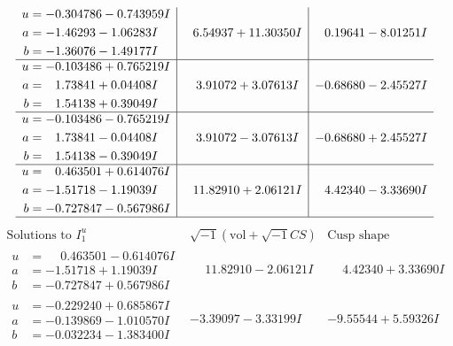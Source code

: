\documentclass[1p]{elsarticle_modified}
\theoremstyle{definition}
\newcommand{\I}{\sqrt{-1}}
\begin{document}
$$\begin{array}{c|c|c}
\begin{aligned}
u &= -0.304786 - 0.743959 I \\
a &= -1.46293 - 1.06283 I \\
b &= -1.36076 - 1.49177 I\end{aligned}
 & \phantom{-}6.54937 + 11.30350 I & \phantom{-}0.19641 - 8.01251 I \\ \hline\begin{aligned}
u &= -0.103486 + 0.765219 I \\
a &= \phantom{-}1.73841 + 0.04408 I \\
b &= \phantom{-}1.54138 + 0.39049 I\end{aligned}
 & \phantom{-}3.91072 + 3.07613 I & -0.68680 - 2.45527 I \\ \hline\begin{aligned}
u &= -0.103486 - 0.765219 I \\
a &= \phantom{-}1.73841 - 0.04408 I \\
b &= \phantom{-}1.54138 - 0.39049 I\end{aligned}
 & \phantom{-}3.91072 - 3.07613 I & -0.68680 + 2.45527 I \\ \hline\begin{aligned}
u &= \phantom{-}0.463501 + 0.614076 I \\
a &= -1.51718 - 1.19039 I \\
b &= -0.727847 - 0.567986 I\end{aligned}
 & \phantom{-}11.82910 + 2.06121 I & \phantom{-}4.42340 - 3.33690 I\\
 \hline 
 \end{array}$$\newpage$$\begin{array}{c|c|c}  
\text{Solutions to }I^u_{1}& \I (\text{vol} + \sqrt{-1}CS) & \text{Cusp shape}\\
 \hline 
\begin{aligned}
u &= \phantom{-}0.463501 - 0.614076 I \\
a &= -1.51718 + 1.19039 I \\
b &= -0.727847 + 0.567986 I\end{aligned}
 & \phantom{-}11.82910 - 2.06121 I & \phantom{-}4.42340 + 3.33690 I \\ \hline\begin{aligned}
u &= -0.229240 + 0.685867 I \\
a &= -0.139869 - 1.010570 I \\
b &= -0.032234 - 1.383400 I\end{aligned}
 & -3.39097 - 3.33199 I & -9.55544 + 5.59326 I \\ \hline\begin{aligned}

\end{aligned}
\end{array}$$
\end{document}
